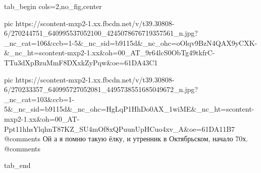  
 
 
 
 


\ifcmt
  tab_begin cols=2,no_fig,center

     pic https://scontent-mxp2-1.xx.fbcdn.net/v/t39.30808-6/270244751_640995537052100_4245078676719357561_n.jpg?_nc_cat=106&ccb=1-5&_nc_sid=b9115d&_nc_ohc=oOlqv9BzN4QAX9yCXK-&_nc_ht=scontent-mxp2-1.xx&oh=00_AT_9r64lcS0ObTg49tkfrC-TTu3dXpBzuMmF8DXxkZyPqw&oe=61DA43C1

     pic https://scontent-mxp2-1.xx.fbcdn.net/v/t39.30808-6/270233357_640995727052081_4495738551685049672_n.jpg?_nc_cat=103&ccb=1-5&_nc_sid=b9115d&_nc_ohc=HgLqP1HhDo0AX_1wiME&_nc_ht=scontent-mxp2-1.xx&oh=00_AT-Ppt11hhsYlqhnT87KZ_SU4mOf8xQPuunUpHCuo4xv_A&oe=61DA11B7
     @comments%
        Ой а я помню такую ёлку, и утренник в Октябрьском, начало 70х.
     @comments%

  tab_end
\fi

